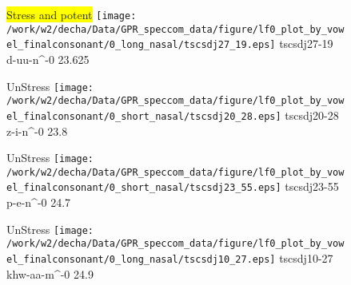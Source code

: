 \documentclass{article}
\begin{document}
\begin{figure}[t]
\begin{minipage}[b]{.24\textwidth}
\colorbox{yellow}{Stress and potent}
\centering
\texttt{[image: /work/w2/decha/Data/GPR\_speccom\_data/figure/lf0\_plot\_by\_vowel\_finalconsonant/0\_long\_nasal/tscsdj27\_19.eps]}
tscsdj27-19 d-uu-n\textasciicircum-0 23.625
\end{minipage}
\begin{minipage}[b]{.24\textwidth}
UnStress
\centering
\texttt{[image: /work/w2/decha/Data/GPR\_speccom\_data/figure/lf0\_plot\_by\_vowel\_finalconsonant/0\_short\_nasal/tscsdj20\_28.eps]}
tscsdj20-28 z-i-n\textasciicircum-0 23.8
\end{minipage}
\begin{minipage}[b]{.24\textwidth}
UnStress
\centering
\texttt{[image: /work/w2/decha/Data/GPR\_speccom\_data/figure/lf0\_plot\_by\_vowel\_finalconsonant/0\_short\_nasal/tscsdj23\_55.eps]}
tscsdj23-55 p-e-n\textasciicircum-0 24.7
\end{minipage}
\begin{minipage}[b]{.24\textwidth}
UnStress
\centering
\texttt{[image: /work/w2/decha/Data/GPR\_speccom\_data/figure/lf0\_plot\_by\_vowel\_finalconsonant/0\_long\_nasal/tscsdj10\_27.eps]}
tscsdj10-27 khw-aa-m\textasciicircum-0 24.9
\end{minipage}
\end{figure}
\end{document}
